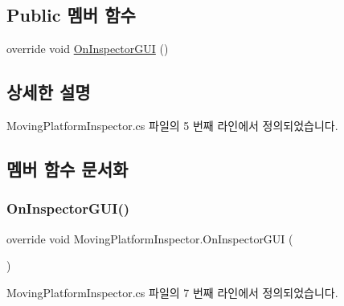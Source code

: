 \subsection*{Public 멤버 함수}
\begin{DoxyCompactItemize}
\item 
override void \mbox{\hyperlink{class_moving_platform_inspector_aa060686c6b8aa6e2d3d854b1fb5b26d3}{On\+Inspector\+G\+UI}} ()
\end{DoxyCompactItemize}


\subsection{상세한 설명}


Moving\+Platform\+Inspector.\+cs 파일의 5 번째 라인에서 정의되었습니다.



\subsection{멤버 함수 문서화}
\mbox{\label{class_moving_platform_inspector_aa060686c6b8aa6e2d3d854b1fb5b26d3}} 
\subsubsection{\texorpdfstring{OnInspectorGUI()}{OnInspectorGUI()}}
{\footnotesize\ttfamily override void Moving\+Platform\+Inspector.\+On\+Inspector\+G\+UI (\begin{DoxyParamCaption}{ }\end{DoxyParamCaption})}



Moving\+Platform\+Inspector.\+cs 파일의 7 번째 라인에서 정의되었습니다.


